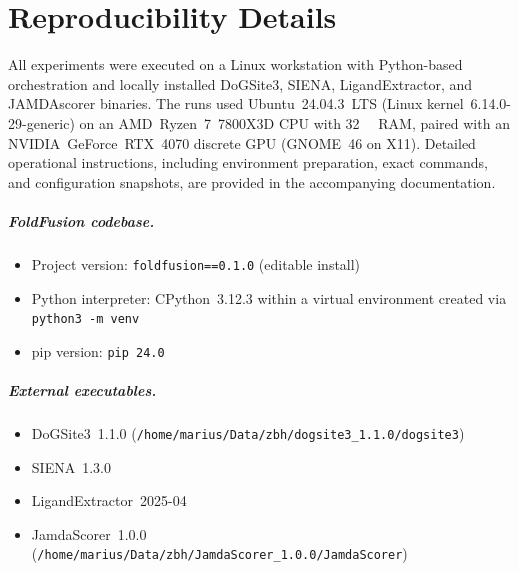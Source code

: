 \chapter{Reproducibility Details}\label{app:reproducibility}
\noindent{}

All experiments were executed on a Linux workstation with Python-based orchestration and locally installed DoGSite3, SIENA, LigandExtractor, and JAMDAscorer binaries. The runs used Ubuntu~24.04.3~LTS (Linux kernel~6.14.0-29-generic) on an AMD~Ryzen~7~7800X3D CPU with \SI{32}{\giga\byte} RAM, paired with an NVIDIA~GeForce~RTX~4070 discrete GPU (GNOME~46 on X11). Detailed operational instructions, including environment preparation, exact commands, and configuration snapshots, are provided in the accompanying documentation.

\paragraph{FoldFusion codebase.}
\begin{itemize}
    \item Project version: \texttt{foldfusion==0.1.0} (editable install)
    \item Python interpreter: CPython~3.12.3 within a virtual environment created via \texttt{python3 -m venv}
    \item pip version: \texttt{pip~24.0}
\end{itemize}

\paragraph{External executables.}
\begin{itemize}
    \item DoGSite3~1.1.0 \hfill (\texttt{/home/marius/Data/zbh/dogsite3\_1.1.0/dogsite3})
    \item SIENA~1.3.0 \hfill {}
    \item LigandExtractor~2025-04 \hfill {}
    \item JamdaScorer~1.0.0 \hfill (\texttt{/home/marius/Data/zbh/JamdaScorer\_1.0.0/JamdaScorer})
\end{itemize}

